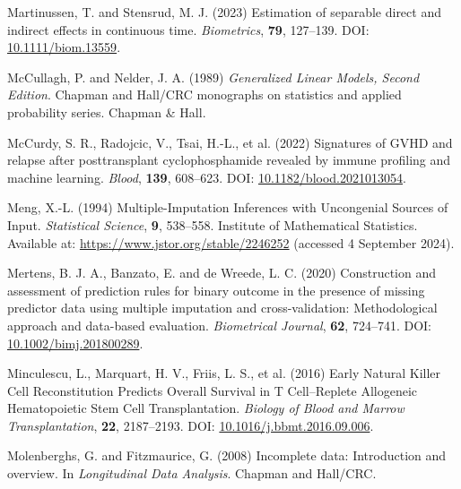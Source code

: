 \documentclass[
  letterpaper,
  DIV=11,
  numbers=noendperiod]{scrreprt}
\newlength{\cslhangindent}
\newenvironment{CSLReferences}[2] %
 {\begin{list}{}{%
  \setlength{\itemindent}{0pt}
  \setlength{\leftmargin}{0pt}
  \setlength{\parsep}{0pt}
  \ifodd #1
   \setlength{\leftmargin}{\cslhangindent}
   \setlength{\itemindent}{-1\cslhangindent}
  \fi
  \setlength{\itemsep}{#2\baselineskip}}}
 {\end{list}}
\begin{document}
\begin{CSLReferences}{1}{1}
Martinussen, T. and Stensrud, M. J. (2023) Estimation of separable
direct and indirect effects in continuous time. \emph{Biometrics},
\textbf{79}, 127--139. DOI:
\href{https://doi.org/10.1111/biom.13559}{10.1111/biom.13559}.

McCullagh, P. and Nelder, J. A. (1989) \emph{Generalized Linear Models,
Second Edition}. Chapman and {Hall}/{CRC} monographs on statistics and
applied probability series. Chapman \& Hall.

McCurdy, S. R., Radojcic, V., Tsai, H.-L., et al. (2022) Signatures of
{GVHD} and relapse after posttransplant cyclophosphamide revealed by
immune profiling and machine learning. \emph{Blood}, \textbf{139},
608--623. DOI:
\href{https://doi.org/10.1182/blood.2021013054}{10.1182/blood.2021013054}.

Meng, X.-L. (1994) Multiple-{Imputation Inferences} with {Uncongenial
Sources} of {Input}. \emph{Statistical Science}, \textbf{9}, 538--558.
Institute of Mathematical Statistics. Available at:
\url{https://www.jstor.org/stable/2246252} (accessed 4 September 2024).

Mertens, B. J. A., Banzato, E. and de Wreede, L. C. (2020) Construction
and assessment of prediction rules for binary outcome in the presence of
missing predictor data using multiple imputation and cross-validation:
{Methodological} approach and data-based evaluation. \emph{Biometrical
Journal}, \textbf{62}, 724--741. DOI:
\href{https://doi.org/10.1002/bimj.201800289}{10.1002/bimj.201800289}.

Minculescu, L., Marquart, H. V., Friis, L. S., et al. (2016) Early
{Natural Killer Cell Reconstitution Predicts Overall Survival} in {T
Cell}--{Replete Allogeneic Hematopoietic Stem Cell Transplantation}.
\emph{Biology of Blood and Marrow Transplantation}, \textbf{22},
2187--2193. DOI:
\href{https://doi.org/10.1016/j.bbmt.2016.09.006}{10.1016/j.bbmt.2016.09.006}.

Molenberghs, G. and Fitzmaurice, G. (2008) Incomplete data:
{Introduction} and overview. In \emph{Longitudinal {Data Analysis}}.
{Chapman and Hall/CRC}.


\end{CSLReferences}
\end{document}
